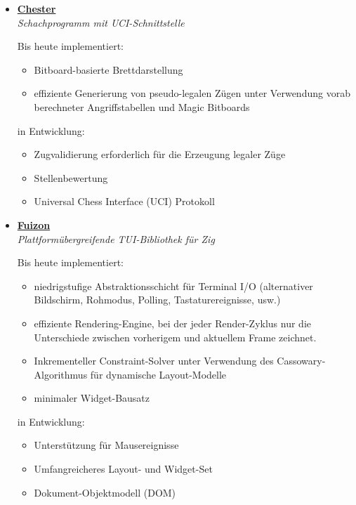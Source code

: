 \documentclass[]{article}
\begin{document}
\begin{itemize}[leftmargin=0.15in, label={}]
    \item
        \href{https://github.com/hiegz/chester}{\large\bfseries Chester} \\
        {\itshape Schachprogramm mit UCI-Schnittstelle}

        Bis heute implementiert:

        \begin{itemize}
            \item Bitboard-basierte Brettdarstellung
            \item effiziente Generierung von pseudo-legalen Zügen unter Verwendung vorab berechneter Angriffstabellen und Magic Bitboards
        \end{itemize}

        in Entwicklung:

        \begin{itemize}
            \item Zugvalidierung erforderlich für die Erzeugung legaler Züge
            \item Stellenbewertung
            \item Universal Chess Interface (UCI) Protokoll
        \end{itemize}

    \item
        \href{https://github.com/hiegz/fuizon}{\large\bfseries Fuizon} \\
        {\itshape Plattformübergreifende TUI-Bibliothek für Zig}

        Bis heute implementiert:

        \begin{itemize}
            \item niedrigstufige Abstraktionsschicht für Terminal I/O  (alternativer Bildschirm, Rohmodus, Polling, Tastaturereignisse, usw.)
            \item effiziente Rendering-Engine, bei der jeder Render-Zyklus nur die Unterschiede zwischen vorherigem und aktuellem Frame zeichnet.
            \item Inkrementeller Constraint-Solver unter Verwendung des Cassowary-Algorithmus für dynamische Layout-Modelle
            \item minimaler Widget-Bausatz
        \end{itemize}

        in Entwicklung:

        \begin{itemize}
            \item Unterstützung für Mausereignisse
            \item Umfangreicheres Layout- und Widget-Set
            \item Dokument-Objektmodell (DOM)
        \end{itemize}
\end{itemize}
\end{document}
